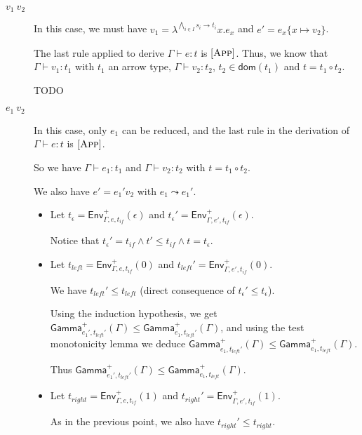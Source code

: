 \documentclass[a4paper]{article}%
\newcommand{\apply}[2]{#1\circ#2}
\newcommand{\dom}[1]{\textsf{dom}(#1)}
\newcommand{\subst}[2]{\{#1 \mapsto #2\}}
\newcommand{\Gp}[2]{\textsf{Env}^{#1}_{#2}}
\newcommand{\arrow}[2]{#1\to #2}
\newcommand{\Genv}[3]{\textsf{Gamma}^{#1}_{#2}(#3)}
\theoremstyle{definition}
\newcommand {\Rule}[1] {[\textsc{#1}]}
\begin{document}
        \begin{description}
          \item[$v_1\ v_2$] In this case, we must have $v_1=\lambda^{\bigwedge_{i\in I} \arrow {s_i} {t_i}}x.e_x$ and $e'=e_x\subst x {v_2}$.
    
          The last rule applied to derive $\Gamma \vdash e:t$ is $\Rule{App}$.
          Thus, we know that $\Gamma \vdash v_1 : t_1$ with $t_1$ an arrow type, $\Gamma \vdash v_2 : t_2$, $t_2 \in \dom {t_1}$ and $t=\apply {t_1} {t_2}$.
          
          TODO
    
          \item[$e_1\ v_2$] In this case, only $e_1$ can be reduced, and the last rule in the derivation of $\Gamma \vdash e:t$ is $\Rule{App}$.
          
          So we have $\Gamma \vdash e_1:t_1$ and $\Gamma \vdash v_2:t_2$ with $t=\apply {t_1} {t_2}$.
    
          We also have $e' = e_1' v_2$ with $e_1 \leadsto e_1'$.
    
          \begin{itemize}
            \item Let $t_\epsilon = \Gp + {\Gamma,e,t_{if}} (\epsilon)$ and $t_\epsilon' = \Gp + {\Gamma,e',t_{if}} (\epsilon)$.
            
            Notice that $t_\epsilon' = t_{if} \land t' \leq t_{if} \land t = t_\epsilon$.
    
            \item Let $t_{left} = \Gp + {\Gamma,e,t_{if}} (0)$ and $t_{left}' = \Gp + {\Gamma,e',t_{if}} (0)$.
    
            We have $t_{left}' \leq t_{left}$ (direct consequence of $t_\epsilon' \leq t_\epsilon$).
      
            Using the induction hypothesis, we get $\Genv + {e_1',t_{left}'} \Gamma \leq \Genv + {e_1,t_{left}'} \Gamma$,
            and using the test monotonicity lemma we deduce $\Genv + {e_1,t_{left}'} \Gamma \leq \Genv + {e_1,t_{left}} \Gamma$.
    
            Thus $\Genv + {e_1',t_{left}'} \Gamma \leq \Genv + {e_1,t_{left}} \Gamma$.
    
            \item Let $t_{right} = \Gp + {\Gamma,e,t_{if}} (1)$ and $t_{right}' = \Gp + {\Gamma,e',t_{if}} (1)$.
            
            As in the previous point, we also have $t_{right}' \leq t_{right}$.
    

\end{itemize}
\end{description}
\end{document}
